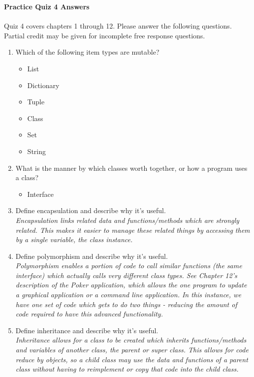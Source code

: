 \documentclass[letter,10pt]{article}
\newcommand*\tick{\item[\Checkmark]}
\newcommand*\fail{\item[\XSolidBrush]}
\begin{document}
\huge
\textbf{Practice Quiz 4 Answers}
\normalsize

\paragraph{}Quiz 4 covers chapters 1 through 12. Please answer the following questions. Partial credit may be given for incomplete free response questions.

\begin{enumerate}
    \item Which of the following item types are mutable?
    \begin{itemize}
        \tick List
        \tick Dictionary
        \fail Tuple
        \tick Class
        \tick Set
        \fail String
    \end{itemize}
    
    \item What is the manner by which classes worth together, or how a program uses a class?
    \begin{itemize}
	\tick Interface
    \end{itemize}
    
    \item Define encapsulation and describe why it's useful. \\
    \textit{Encapsulation links related data and functions/methods which are strongly related. This makes it easier to manage these related things by accessing them by a single variable, the class instance.}
    
    \item Define polymorphism and describe why it's useful. \\
    \textit{Polymorphism enables a portion of code to call similar functions (the same interface) which actually calls very different class types. See Chapter 12's description of the Poker application, which allows the one program to update a graphical application or a command line application. In this instance, we have one set of code which gets to do two things - reducing the amount of code required to have this advanced functionality.}
    
    \item Define inheritance and describe why it's useful. \\
    \textit{Inheritance allows for a class to be created which inherits functions/methods and variables of another class, the parent or super class. This allows for code reduce by objects, so a child class may use the data and functions of a parent class without having to reimplement or copy that code into the child class.}
    

\end{enumerate}
\end{document}
